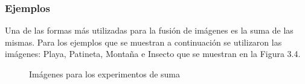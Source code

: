 \subsubsection{Ejemplos}

Una de las formas m\'as utilizadas para la fusi\'on de im\'agenes es la suma de las mismas. Para los ejemplos que se muestran a continuaci\'on se utilizaron las im\'agenes: Playa, Patineta, Monta\~na e Insecto que se muestran en la Figura 3.4.

\begin{figure}
	\begin{center}
		\caption{Im\'agenes para los experimentos de suma}
	\end{center}
\end{figure}

